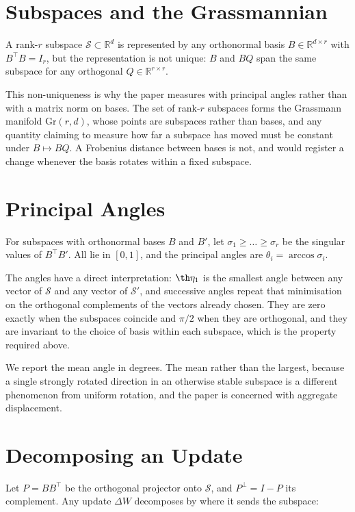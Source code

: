 \documentclass[10pt,twocolumn,letterpaper]{article}
\begin{document}
\section{Subspaces and the Grassmannian}


A rank-$r$ subspace $\mathcal{S} \subset \mathbb{R}^{d}$ is represented by any orthonormal basis $B \in \mathbb{R}^{d \times r}$ with $B^{\top}B = I_r$, but the representation is not unique: $B$ and $BQ$ span the same subspace for any orthogonal $Q \in \mathbb{R}^{r \times r}$.

This non-uniqueness is why the paper measures with principal angles rather than with a matrix norm on bases. The set of rank-$r$ subspaces forms the Grassmann manifold $\mathrm{Gr}(r, d)$, whose points are subspaces rather than bases, and any quantity claiming to measure how far a subspace has moved must be constant under $B \mapsto BQ$. A Frobenius distance between bases is not, and would register a change whenever the basis rotates within a fixed subspace.


\section{Principal Angles}


For subspaces with orthonormal bases $B$ and $B'$, let $\sigma_1 \ge \dots \ge \sigma_r$ be the singular values of $B^{\top}B'$. All lie in $[0, 1]$, and the principal angles are $\theta_i = \arccos \sigma_i$.

The angles have a direct interpretation: $\th\eta_1$ is the smallest angle between any vector of $\mathcal{S}$ and any vector of $\mathcal{S}'$, and successive angles repeat that minimisation on the orthogonal complements of the vectors already chosen. They are zero exactly when the subspaces coincide and $\pi/2$ when they are orthogonal, and they are invariant to the choice of basis within each subspace, which is the property required above.

We report the mean angle in degrees. The mean rather than the largest, because a single strongly rotated direction in an otherwise stable subspace is a different phenomenon from uniform rotation, and the paper is concerned with aggregate displacement.


\section{Decomposing an Update}


Let $P = BB^{\top}$ be the orthogonal projector onto $\mathcal{S}$, and $P^{\perp} = I - P$ its complement. Any update $\Delta W$ decomposes by where it sends the subspace:
\end{document}
